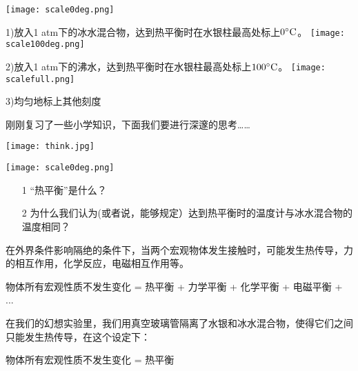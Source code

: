 \documentclass[CJK]{beamer}
\begin{document}
\begin{frame}
\bch
{}
\texttt{[image: scale0deg.png]}

{\scriptsize 1)放入1 atm下的冰水混合物，达到热平衡时在水银柱最高处标上$0^\circ \mathrm{C}$。}
\emini
\hspace{0.1in}
\texttt{[image: scale100deg.png]}

{\vskip 0.3in}

{\scriptsize 2)放入1 atm下的沸水，达到热平衡时在水银柱最高处标上$100^\circ \mathrm{C}$。}
\emini
\hspace{0.1in}
\texttt{[image: scalefull.png]}

{\vskip 0.3in}

{\scriptsize 3)均匀地标上其他刻度

\vspace{0.36in} 

}
\emini
\ech
\end{frame}

\begin{frame}
\bch
刚刚复习了一些小学知识，下面我们要进行深邃的思考……

\begin{center}\texttt{[image: think.jpg]}\end{center}
\ech
\end{frame}


\begin{frame}
\bch
{}
\texttt{[image: scale0deg.png]}
\emini
{}
\begin{itemize}
\item[1]{ “热平衡”是什么？}
\item[2]{ 为什么我们认为(或者说，能够规定）达到热平衡时的温度计与冰水混合物的温度相同？}
\end{itemize}
\emini
\ech
\end{frame}


\begin{frame}
\bch
在外界条件影响隔绝的条件下，当两个宏观物体发生接触时，可能发生热传导，力的相互作用，化学反应，电磁相互作用等。

\skipline

物体所有宏观性质不发生变化 = 热平衡 + 力学平衡 + 化学平衡 + 电磁平衡 + ... 

\skiplines

在我们的幻想实验里，我们用真空玻璃管隔离了水银和冰水混合物，使得它们之间只能发生热传导，在这个设定下：

\skipline

物体所有宏观性质不发生变化 = 热平衡

\ech
\end{frame}
\end{document}

